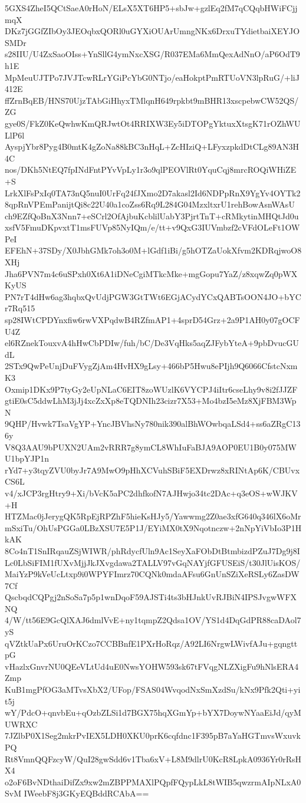 5GXS4ZheI5QCtSaeA0rHoN/ELsX5XT6HP5+sbJw+gzlEq2fM7qCQqbHWiFCjjmqX
DKz7jGGfZIbOy3JEOqbxQORl0uGYXiOUArUmngNKx6DrxuTYdietbaiXEYJOSMDr
s28IIU/U4ZxSaoOIss+YnSllG4ymNxcXSG/R037EMa6MmQexAdNnO/aP6OdT9h1E
MpMeuUJTPo7JVJTcwRLrYGiPcYbG0NTjo/eaHokptPmRTUoVN3lpRuG/+liJ412E
ffZrnBqEB/HNS70UjzTAbGiHhyxTMlqnH649rpkbt9mBHR13xscpebwCW52QS/ZG
gye0S/FkZ0KeQwhwKmQRJwtOt4RRIXW3Ey5iDTOPgYktuxXtsgK71rOZhWULlP6l
AyspjYbr8Pyg4B0mtK4gZoNa88kBC3nHqL+ZcHIziQ+LFyxzpkdDtCLg89AN3H4C
nos/DKh5NtEQ7fpINdFntPYvVpLy1r3o9qlPEOVlRt0YquCqj8mrcROQiWHiZE+S
LrkXlFsPxIq0TA73nQ5nuI0UrFq24fJXmo2D7akasl2Id6NDPpRnX9YgYv4OYTk2
8qpRnVPEmPanijtQi8c22U40a1coZss6Rq9L284G04MzxltxrU1rehBowAsnWAsU
ch9EZfQoBnX3Nnn7+eSCrl2OfAjbuKcblilUabY3PjrtTnT+cRMkytinMHQtJd0u
xsfV5FmuDKpvxtT1msFUVp85NyIQm/e/tt+v9QxG3IUVmbzf2cVFdOLeFt1OWPeI
EFEhN+37SDy/X0JbhGMk7oh3o0M+lGdf1iBi/g5hOTZaUokXfvm2KDRqjwoO8XHj
Jha6PVN7m4c6uSPxh0Xt6A1iDNeCgiMTkcMke+mgGopu7YaZ/z8xqwZq0pWXKyUS
PN7rT4dHw6ag3hqbxQvUdjPGW3GtTWt6EGjACydYCxQABTsOON4JO+bYCr7Rq515
sp28IWtCPDYnxfiw6rwVXPqdwB4RZfmAP1+4sprD54Grz+2a9P1AH0y07gOCFU4Z
el6RZnekTouxvA4hHwCbPDIw/fuh/bC/De3VqHks5aqZJFybYteA+9pbDvucGUdL
2STx9QwPeUnjDuFVygZjAm4HvHX9gLsy+466bP5Hwu8ePIjh9Q6066CfstcNxmK3
Oxmip1DKx9P7tyGy2eUpNLaC6EIT8zoWUzlK6VYCPJ4iItr6cseLhy9v8i2fJJZF
gtiE0sC5ddwLhM3jJj4xcZxXp8eTQDNIh23cizr7X53+Mo4bzI5eMz8XjFBM3WpN
9QHP/Hvwk7TsaVgYP+YncJBVhsNy780nik390alBhWOwbqaLSd4+ss6aZRgC136y
V8Q3AAU9bPUXN2UAm2vRRR7g8ymCL8WhIuFaBJA9AOP0EU1B0y075MWU1bpYJP1n
rYd7+y3tqyZVU0byJr7A9MwO9pHhXCVuhSBiF5EXDrwz8xRINtAp6K/CBUvxCS6L
v4/xJCP3rgHtry9+Xi/bVcK5aPC2dhfkofN7AJHwjo34tc2DAc+q3eOS+wWJKV+H
HTZMac0jJerygQK5RpEjRPZhF5hieKsHJy5/Yawwmg2Z0ae3xfG640q346lX6oMr
mSxiTu/OhUsPGGa0LBzXSU7E5P1J/EYiMX0tX9Nqotnczw+2nNpYiVbIo3P1HkAK
8Co4nT1SnIRqauZSjWIWR/phRdycfUln9Ac1SeyXaFObDtBtmbizdPZuJ7Dg9j8I
Lc0LbSiFIM1fUXvMjjJkJXvgdawa2TALLV97vGqNAYjfGFUSEiS/t30JlUisKOS/
MaiYzP9kVeUcLtxp9i0WPYFImrz70CQNk0mdaAFsu6GnUnSZiXeRSLy6ZasDW7Cf
QscbqdCQPgj2nSoSa7p5p1wnDqoF59AJSTi4ts3bHJnkUvRJBiN4IPSJvgwWFXNQ
4/W/tt56E9GcQlXAJ6dmlVvE+ny1tqmpZ2Qdsa1OV/YS1d4DqGdPR88caDAol7yS
qVZtkUaPx6UruOrKCzo7CCBBnfE1PXrHoRqz/A92LI6NrgwLWivfAJu+gqngttpG
vHazlxGnvrNU0QEeVLtUd4uE0NwsYOHW593sk67tFVqgNLZXigFu9hNlsERA4Zmp
KuB1mgPfOG3aMTvsXbX2/UFop/FSAS04WvqodNxSmXzdSu/kNx9Pfk2Qti+yit5j
wY/PdcO+qnvbEu+qOzbZLSi1d7BGX75hqXGmYp+bYX7DoywNYaaEiJd/qyMUWRXC
7JZlbP0X1Seg2mkrPvIEX5LDH0XKU0prK6cqfdnc1F395pB7aYaHGTmvsWxuvkPQ
Rt8VmnQQFzcyW/QuI28gwSdd6v1Tba6xV+L8M9dlrU0KcR8LpkA0936Yr0rRsHX4
o2oF6BvNDthaiDifZx9xw2mZBPPMAXlPQpfFQypLkL8tWIB5qwzrmAIpNLxA0SvM
IWeebF8j3GKyEQBddRCAbA==
